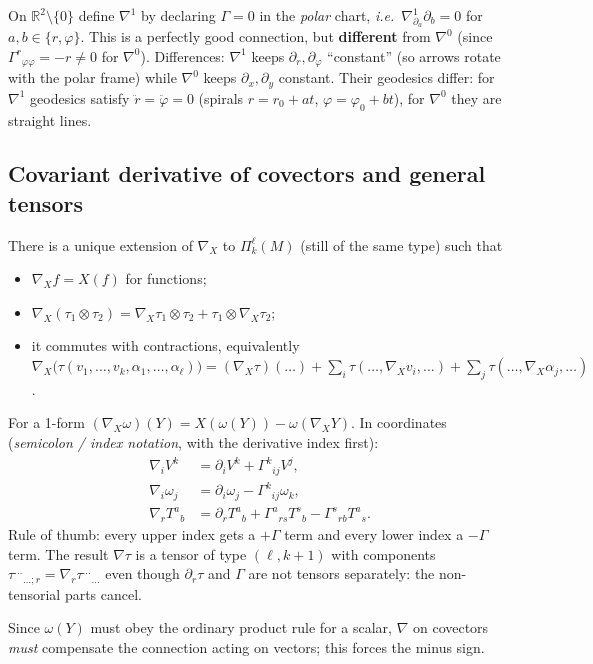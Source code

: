 \documentclass[11pt,a4paper]{article}
\numberwithin{equation}{section}
\theoremstyle{definition}
\theoremstyle{plain}
\newcommand{\R}{\mathbb{R}}
\newcommand{\TF}[2]{\Pi^{#1}_{#2}}                  %
\newcommand{\ie}{\emph{i.e.}\ }
\begin{document}
\begin{example}
On $\R^2\setminus\{0\}$ define $\nabla^1$ by declaring $\Gamma=0$ in the \emph{polar} chart, \ie $\nabla^1_{\partial_a}\partial_b=0$ for $a,b\in\{r,\varphi\}$. This is a perfectly good connection, but \textbf{different} from $\nabla^0$ (since $\Gamma^r{}_{\varphi\varphi}=-r\neq0$ for $\nabla^0$). Differences: $\nabla^1$ keeps $\partial_r,\partial_\varphi$ ``constant'' (so arrows rotate with the polar frame) while $\nabla^0$ keeps $\partial_x,\partial_y$ constant. Their geodesics differ: for $\nabla^1$ geodesics satisfy $\ddot r=\ddot\varphi=0$ (spirals $r=r_0+at$, $\varphi=\varphi_0+bt$), for $\nabla^0$ they are straight lines.
\end{example}

\subsection{Covariant derivative of covectors and general tensors}
\begin{formal}
There is a unique extension of $\nabla_X$ to $\TF{\ell}{k}(M)$ (still of the same type) such that
\begin{itemize}[nosep]
\item $\nabla_Xf=X(f)$ for functions;
\item $\nabla_X(\tau_1\otimes\tau_2)=\nabla_X\tau_1\otimes\tau_2+\tau_1\otimes\nabla_X\tau_2$;
\item it commutes with contractions, equivalently
$\nabla_X\big(\tau(v_1,\dots,v_k,\alpha_1,\dots,\alpha_\ell)\big)=(\nabla_X\tau)(\dots)+\sum_i\tau(\dots,\nabla_Xv_i,\dots)+\sum_j\tau(\dots,\nabla_X\alpha_j,\dots)$.
\end{itemize}
For a 1-form $(\nabla_X\omega)(Y)=X(\omega(Y))-\omega(\nabla_XY)$. In coordinates (\emph{semicolon / index notation}, with the derivative index first):
\begin{align*}
\nabla_iV^k&=\partial_iV^k+\Gamma^k{}_{ij}V^j,\\
\nabla_i\omega_j&=\partial_i\omega_j-\Gamma^k{}_{ij}\omega_k,\\
\nabla_r T^{a}{}_{b}&=\partial_rT^a{}_b+\Gamma^a{}_{rs}T^s{}_b-\Gamma^s{}_{rb}T^a{}_s .
\end{align*}
Rule of thumb: every upper index gets a $+\Gamma$ term and every lower index a $-\Gamma$ term. The result $\nabla\tau$ is a tensor of type $(\ell,k+1)$ with components $\tau^{\dots}{}_{\dots;r}=\nabla_r\tau^{\dots}{}_{\dots}$ even though $\partial_r\tau$ and $\Gamma$ are not tensors separately: the non-tensorial parts cancel.
\end{formal}
\begin{intuition}
Since $\omega(Y)$ must obey the ordinary product rule for a scalar, $\nabla$ on covectors \emph{must} compensate the connection acting on vectors; this forces the minus sign.
\end{intuition}
\end{document}
